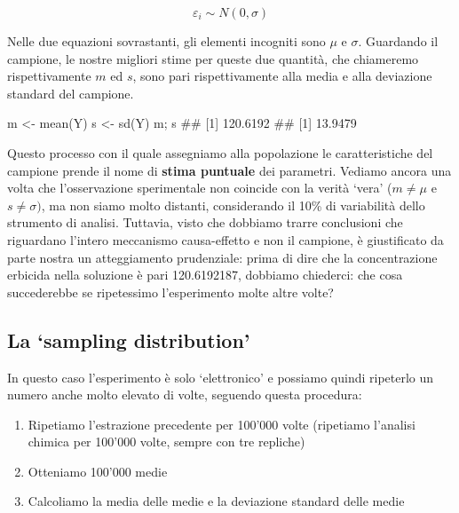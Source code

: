 \documentclass[a4paper,12pt,oneside]{book}
\providecommand{\tightlist}{%
  \setlength{\itemsep}{0pt}\setlength{\parskip}{0pt}}
\newenvironment{Shaded}{\begin{snugshade}}{\end{snugshade}}
\newcommand{\DocumentationTok}[1]{#1}
\newcommand{\OtherTok}[1]{#1}
\newcommand{\FunctionTok}[1]{#1}
\newcommand{\NormalTok}[1]{#1}
\begin{document}
\[\varepsilon_i \sim N(0, \sigma)\]

Nelle due equazioni sovrastanti, gli elementi incogniti sono \(\mu\) e \(\sigma\). Guardando il campione, le nostre migliori stime per queste due quantità, che chiameremo rispettivamente \(m\) ed \(s\), sono pari rispettivamente alla media e alla deviazione standard del campione.

\begin{Shaded}
\begin{Highlighting}[]
\NormalTok{m }\OtherTok{\textless{}{-}} \FunctionTok{mean}\NormalTok{(Y)}
\NormalTok{s }\OtherTok{\textless{}{-}} \FunctionTok{sd}\NormalTok{(Y)}
\NormalTok{m; s}
\DocumentationTok{\#\# [1] 120.6192}
\DocumentationTok{\#\# [1] 13.9479}
\end{Highlighting}
\end{Shaded}

Questo processo con il quale assegniamo alla popolazione le caratteristiche del campione prende il nome di \textbf{stima puntuale} dei parametri. Vediamo ancora una volta che l'osservazione sperimentale non coincide con la verità `vera' (\(m \neq \mu\) e \(s \neq \sigma)\), ma non siamo molto distanti, considerando il 10\% di variabilità dello strumento di analisi. Tuttavia, visto che dobbiamo trarre conclusioni che riguardano l'intero meccanismo causa-effetto e non il campione, è giustificato da parte nostra un atteggiamento prudenziale: prima di dire che la concentrazione erbicida nella soluzione è pari 120.6192187, dobbiamo chiederci: che cosa succederebbe se ripetessimo l'esperimento molte altre volte?

\hypertarget{la-sampling-distribution}{%
\subsection{La `sampling distribution'}\label{la-sampling-distribution}}

In questo caso l'esperimento è solo `elettronico' e possiamo quindi ripeterlo un numero anche molto elevato di volte, seguendo questa procedura:

\begin{enumerate}
\def\labelenumi{\arabic{enumi}.}
\tightlist
\item
  Ripetiamo l'estrazione precedente per 100'000 volte (ripetiamo l'analisi chimica per 100'000 volte, sempre con tre repliche)
\item
  Otteniamo 100'000 medie
\item
  Calcoliamo la media delle medie e la deviazione standard delle medie
\end{enumerate}
\end{document}
